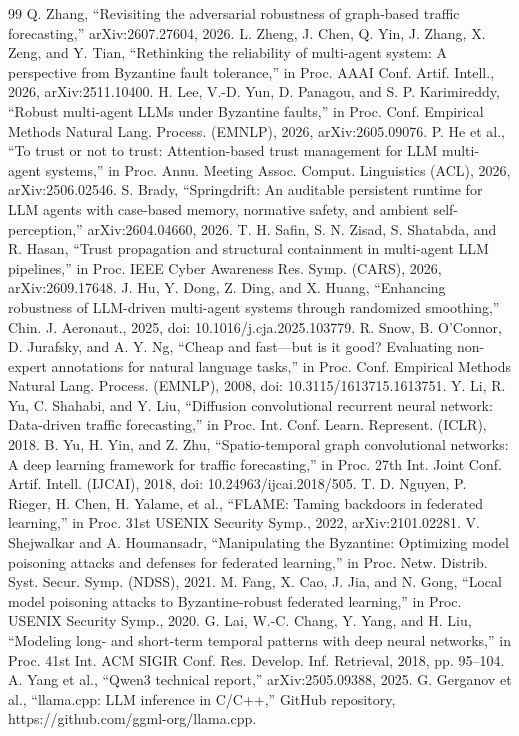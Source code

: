 \documentclass[journal]{IEEEtran}
\begin{document}
\begin{thebibliography}{99}
 Q. Zhang, ``Revisiting the adversarial robustness of graph-based traffic forecasting,'' arXiv:2607.27604, 2026.
 L. Zheng, J. Chen, Q. Yin, J. Zhang, X. Zeng, and Y. Tian, ``Rethinking the reliability of multi-agent system: A perspective from Byzantine fault tolerance,'' in Proc. AAAI Conf. Artif. Intell., 2026, arXiv:2511.10400.
 H. Lee, V.-D. Yun, D. Panagou, and S. P. Karimireddy, ``Robust multi-agent LLMs under Byzantine faults,'' in Proc. Conf. Empirical Methods Natural Lang. Process. (EMNLP), 2026, arXiv:2605.09076.
 P. He et al., ``To trust or not to trust: Attention-based trust management for LLM multi-agent systems,'' in Proc. Annu. Meeting Assoc. Comput. Linguistics (ACL), 2026, arXiv:2506.02546.
 S. Brady, ``Springdrift: An auditable persistent runtime for LLM agents with case-based memory, normative safety, and ambient self-perception,'' arXiv:2604.04660, 2026.
 T. H. Safin, S. N. Zisad, S. Shatabda, and R. Hasan, ``Trust propagation and structural containment in multi-agent LLM pipelines,'' in Proc. IEEE Cyber Awareness Res. Symp. (CARS), 2026, arXiv:2609.17648.
 J. Hu, Y. Dong, Z. Ding, and X. Huang, ``Enhancing robustness of LLM-driven multi-agent systems through randomized smoothing,'' Chin. J. Aeronaut., 2025, doi: 10.1016/j.cja.2025.103779.
 R. Snow, B. O'Connor, D. Jurafsky, and A. Y. Ng, ``Cheap and fast---but is it good? Evaluating non-expert annotations for natural language tasks,'' in Proc. Conf. Empirical Methods Natural Lang. Process. (EMNLP), 2008, doi: 10.3115/1613715.1613751.
 Y. Li, R. Yu, C. Shahabi, and Y. Liu, ``Diffusion convolutional recurrent neural network: Data-driven traffic forecasting,'' in Proc. Int. Conf. Learn. Represent. (ICLR), 2018.
 B. Yu, H. Yin, and Z. Zhu, ``Spatio-temporal graph convolutional networks: A deep learning framework for traffic forecasting,'' in Proc. 27th Int. Joint Conf. Artif. Intell. (IJCAI), 2018, doi: 10.24963/ijcai.2018/505.
 T. D. Nguyen, P. Rieger, H. Chen, H. Yalame, et al., ``FLAME: Taming backdoors in federated learning,'' in Proc. 31st USENIX Security Symp., 2022, arXiv:2101.02281.
 V. Shejwalkar and A. Houmansadr, ``Manipulating the Byzantine: Optimizing model poisoning attacks and defenses for federated learning,'' in Proc. Netw. Distrib. Syst. Secur. Symp. (NDSS), 2021.
 M. Fang, X. Cao, J. Jia, and N. Gong, ``Local model poisoning attacks to Byzantine-robust federated learning,'' in Proc. USENIX Security Symp., 2020.
 G. Lai, W.-C. Chang, Y. Yang, and H. Liu, ``Modeling long- and short-term temporal patterns with deep neural networks,'' in Proc. 41st Int. ACM SIGIR Conf. Res. Develop. Inf. Retrieval, 2018, pp. 95--104.
 A. Yang et al., ``Qwen3 technical report,'' arXiv:2505.09388, 2025.
 G. Gerganov et al., ``llama.cpp: LLM inference in C/C++,'' GitHub repository, https://github.com/ggml-org/llama.cpp.
\end{thebibliography}
\end{document}
